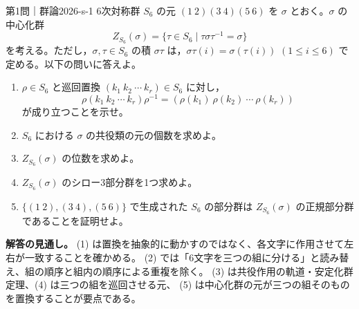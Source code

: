\begin{problem}{第1問｜群論}{2026-s-1}
6次対称群 $S_6$ の元 $(1\ 2)(3\ 4)(5\ 6)$ を $\sigma$ とおく。$\sigma$ の中心化群
\[
Z_{S_6}(\sigma)=\{\tau\in S_6\mid\tau\sigma\tau^{-1}=\sigma\}
\]
を考える。ただし，$\sigma,\tau\in S_6$ の積 $\sigma\tau$ は，$\sigma\tau(i)=\sigma(\tau(i))$ $(1\le i\le6)$ で定める。以下の問いに答えよ。
\begin{enumerate}
  \item[(1)] $\rho\in S_6$ と巡回置換 $(k_1\ k_2\ \cdots\ k_r)\in S_6$ に対し，
  \[
  \rho(k_1\ k_2\ \cdots\ k_r)\rho^{-1}=(\rho(k_1)\ \rho(k_2)\ \cdots\ \rho(k_r))
  \]
  が成り立つことを示せ。
  \item[(2)] $S_6$ における $\sigma$ の共役類の元の個数を求めよ。
  \item[(3)] $Z_{S_6}(\sigma)$ の位数を求めよ。
  \item[(4)] $Z_{S_6}(\sigma)$ のシロー3部分群を1つ求めよ。
  \item[(5)] $\{(1\ 2),(3\ 4),(5\ 6)\}$ で生成された $S_6$ の部分群は $Z_{S_6}(\sigma)$ の正規部分群であることを証明せよ。
\end{enumerate}
\end{problem}
\begin{memo*}
\textbf{解答の見通し。}
(1) は置換を抽象的に動かすのではなく、各文字に作用させて左右が一致することを確かめる。
(2) では「6文字を三つの組に分ける」と読み替え、組の順序と組内の順序による重複を除く。
(3) は共役作用の軌道・安定化群定理、(4) は三つの組を巡回させる元、
(5) は中心化群の元が三つの組そのものを置換することが要点である。
\end{memo*}
